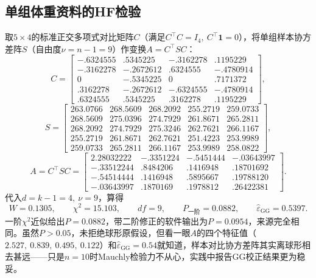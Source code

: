\subsection{单组体重资料的HF检验}
取$5\times 4$的标准正交多项式对比矩阵$C$（满足$C^\top C=I_4,\ C^\top\mathbf 1=0$），将单组样本协方差阵$S$（自由度$\nu=n-1=9$）作变换$A=C^\top SC$：
\[
C=\begin{bmatrix}
-.6324555&.5345225&-.3162278&.1195229\\
-.3162278&-.2672612&.6324555&-.4780914\\
0&-.5345225&0&.7171372\\
.3162278&-.2672612&-.6324555&-.4780914\\
.6324555&.5345225&.3162278&.1195229
\end{bmatrix},
\]
\[
S=\begin{bmatrix}
263.0766&268.5609&268.2092&255.2719&259.0733\\
268.5609&275.0396&274.7929&261.8671&265.2811\\
268.2092&274.7929&275.3246&262.7621&266.1167\\
255.2719&261.8671&262.7621&251.4223&253.9989\\
259.0733&265.2811&266.1167&253.9989&258.0822
\end{bmatrix},
\]
\[
A=C^\top SC=\begin{bmatrix}
2.28032222&-.3351224&-.5451444&-.03643997\\
-.33512244&.8484206&.1416948&.18701692\\
-.54514444&.1416948&.5895667&.19788120\\
-.03643997&.1870169&.1978812&.26422381
\end{bmatrix}.
\]
代入$d=k-1=4,\ \nu=9$，算得
\[
W=0.1305,\qquad \chi^2=15.103,\qquad df=9,\qquad P_{\text{一阶}}=0.0882,\qquad \widehat\varepsilon_{\mathrm{GG}}=0.5397.
\]
一阶$\chi^2$近似给出$P=0.0882$，带二阶修正的软件输出为$P=0.0954$，来源完全相同。虽然$P>0.05$，未拒绝球形原假设，但看一眼$A$的四个特征值（$2.527,\ 0.839,\ 0.495,\ 0.122$）和$\widehat\varepsilon_{\mathrm{GG}}=0.54$就知道，样本对比协方差阵其实离球形相去甚远——只是$n=10$时Mauchly检验力不从心，实践中报告GG校正结果更为稳妥。
